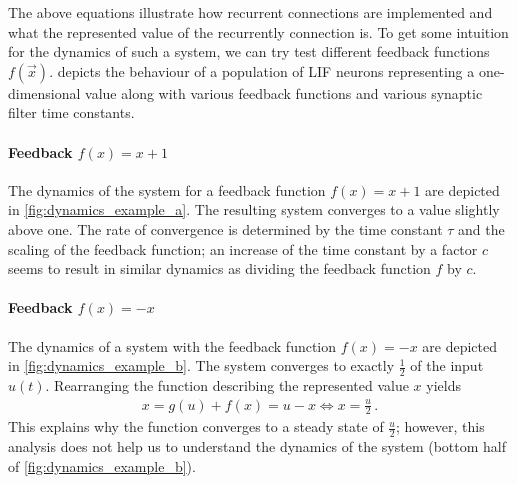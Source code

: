 \documentclass[10pt,letterpaper,oneside]{article}
\begin{document}
The above equations illustrate how recurrent connections are implemented and what the represented value of the recurrently connection is. To get some intuition for the dynamics of such a system, we can try test different feedback functions $f(\vec x)$.  depicts the behaviour of a population of LIF neurons representing a one-dimensional value along with various feedback functions and various synaptic filter time constants.


\paragraph{Feedback $f(x) = x + 1$}
The dynamics of the system for a feedback function $f(x) = x + 1$ are depicted in \cref{fig:dynamics_example_a}. The resulting system converges to a value slightly above one. The rate of convergence is determined by the time constant $\tau$ and the scaling of the feedback function; an increase of the time constant by a factor $c$ seems to result in similar dynamics as dividing the feedback function $f$ by $c$.


\paragraph{Feedback $f(x) = -x$}
The dynamics of a system with the feedback function $f(x) = -x$ are depicted in \cref{fig:dynamics_example_b}. The system converges to exactly $\frac{1}2$ of the input $u(t)$. Rearranging the function describing the represented value $x$ yields
\begin{align*}
	x = g(u) + f(x) = u - x \Leftrightarrow x = \frac{u}2 \,.
\end{align*}
This explains why the function converges to a steady state of $\frac{u}2$; however, this analysis does not help us to understand the dynamics of the system (bottom half of \cref{fig:dynamics_example_b}).
\end{document}
